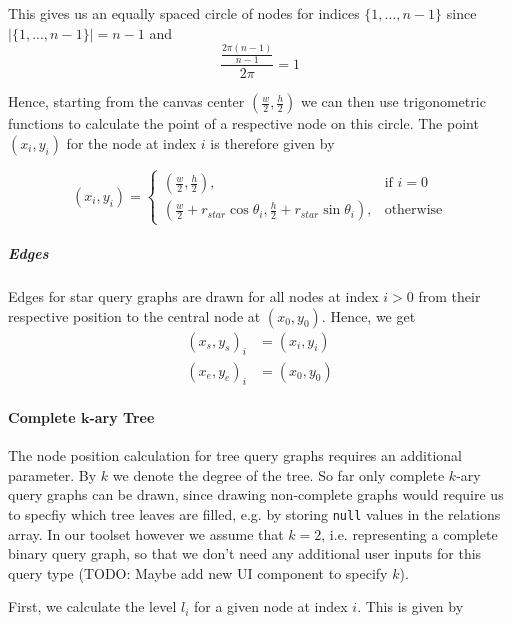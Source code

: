 This gives us an equally spaced circle of nodes for indices $\{1,\dots,n-1\}$ since $\vert\{1,...,n-1\}\vert = n-1$ and
\begin{equation}
    \frac{\frac{2\pi(n-1)}{n-1}}{2\pi} = 1   
\end{equation}

Hence, starting from the canvas center $(\frac{w}{2}, \frac{h}{2})$ we can then use trigonometric functions to calculate the point of a respective node on this circle.
The point $(x_i, y_i)$ for the node at index $i$ is therefore given by

\begin{equation}
    (x_i, y_i) = 
    \begin{cases}
        (\frac{w}{2}, \frac{h}{2}),& \text{if } i = 0\\
        (\frac{w}{2} + r_{star}\cos{\theta_i}, \frac{h}{2} + r_{star}\sin{\theta_i}), & \text{otherwise}
    \end{cases}
\end{equation}

\subparagraph{Edges}
Edges for star query graphs are drawn for all nodes at index $i > 0$ from their respective position to the central node at $(x_0, y_0)$. Hence, we get 
\begin{equation}
    \begin{aligned}
        (x_s, y_s)_i &= (x_i, y_i)\\   
        (x_e, y_e)_i &= (x_{0}, y_{0})
    \end{aligned}
\end{equation}

\paragraph{Complete $\mathbf{k}$-ary Tree}

The node position calculation for tree query graphs requires an additional parameter. 
By $k$ we denote the degree of the tree. So far only complete $k$-ary query graphs can be drawn, since drawing non-complete graphs would require us to specfiy which tree leaves are filled, e.g. by storing \texttt{null} values in the relations array. In our toolset however we assume that $k = 2$, i.e. representing a complete binary query graph, so that we don't need any additional user inputs for this query type (TODO: Maybe add new UI component to specify $k$).

First, we calculate the level $l_i$ for a given node at index $i$. This is given by

